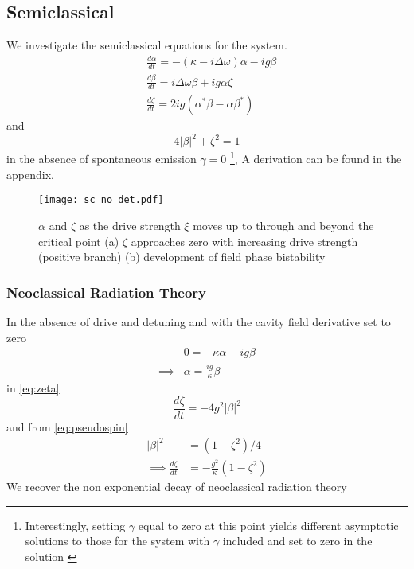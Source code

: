 \subsection{Semiclassical}
We investigate the semiclassical equations for the system.
\begin{align}
  &\frac{d \alpha}{dt} = -(\kappa -i \Delta \omega) \alpha-ig \beta \label{eq:alpha}\\
  &\frac{d \beta}{dt} = i \Delta \omega \beta +ig \alpha \zeta \label{eq:beta}\\
  &\frac{d \zeta}{dt} = 2 i g(\alpha^* \beta -\alpha \beta^*)\label{eq:zeta}
\end{align}
and
\begin{equation}
  4|\beta|^2+\zeta^2 = 1 \label{eq:pseudospin}
\end{equation}
in the absence of spontaneous emission $\gamma=0$
\footnote{ Interestingly, setting $\gamma$ equal to zero at this point yields different asymptotic solutions to those for the system with $\gamma$ included and set to zero in the solution \cite{Alsing1990}},
A derivation can be found in the appendix.
\begin{figure}[!htb]
  \texttt{[image: sc\_no\_det.pdf]}
  \caption{$\alpha$ and $\zeta$ as the drive strength $\xi$ moves up to through and beyond the critical point (a) $\zeta$ approaches zero with increasing drive strength (positive branch)\label{fig:zeta} (b) development of field phase bistability}\label{fig:alpha}
  \label{fig:sc_no_det}
\end{figure}
\subsubsection{Neoclassical Radiation Theory}
In the absence of drive and detuning and with the cavity field derivative set to zero
\begin{align}
  & 0 = -\kappa \alpha - ig \beta \\
  \implies & \alpha = \frac{ig}{\kappa} \beta
\end{align}
in \cref{eq:zeta}
\begin{equation}
  \frac{d \zeta}{dt} = -4 g^2 |\beta|^2
\end{equation}
and from \cref{eq:pseudospin}
\begin{align}
   |\beta|^2 &= (1-\zeta^2)/4 \\
\implies \frac{d \zeta}{dt} &= -\frac{g^2}{\kappa} (1-\zeta^2)
\end{align}
We recover the non exponential decay of neoclassical radiation theory
